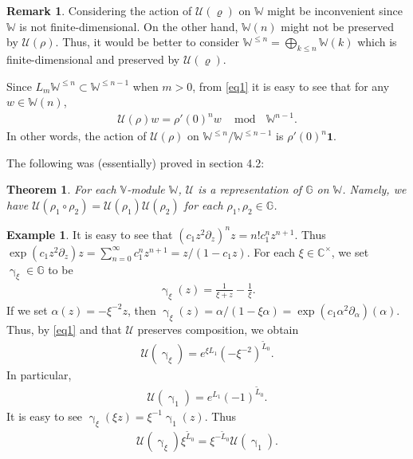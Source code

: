 \documentclass[11pt,b5paper,notitlepage]{article}
\theoremstyle{definition}
\newtheorem{eg}[df]{Example}
\newtheorem{rem}[df]{Remark}
\theoremstyle{plain}
\newtheorem{thm}[df]{Theorem}
\newcommand{\mc}{\mathcal}
\newcommand{\wtd}{\widetilde}
\newcommand{\id}{\mathbf{1}}
\newcommand{\Vbb}{\mathbb V}
\newcommand{\Wbb}{\mathbb W}
\newcommand{\Gbb}{\mathbb G}
\newcommand{\Cbb}{\mathbb C}
\numberwithin{equation}{section}
\begin{document}
\begin{rem}
Considering the action of $\mc U(\varrho)$ on $\Wbb$ might be inconvenient since $\Wbb$ is not finite-dimensional. On the other hand, $\Wbb(n)$ might not be preserved by $\mc U(\rho)$. Thus, it would be better to consider $\Wbb^{\leq n}=\bigoplus_{k\leq n}\Wbb(k)$\index{VW@$\Vbb^{\leq n},\Wbb^{\leq n}$} which is finite-dimensional and preserved by $\mc U(\varrho)$.

Since $L_m\Wbb^{\leq n}\subset\Wbb^{\leq n-1}$ when $m>0$, from \eqref{eq1} it is easy to see that for any $w\in\Wbb(n)$,
\begin{align}
\mc U(\rho)w=\rho'(0)^nw~~\mod~~ \Wbb^{n-1}.\label{eq5}
\end{align}
In other words, the action of $\mc U(\rho)$ on $\Wbb^{\leq n}/\Wbb^{\leq n-1}$ is $\rho'(0)^n\id$.
\end{rem}


The following was (essentially) proved in \cite{Hua97a} section 4.2:
\begin{thm}
	For each $\Vbb$-module $\Wbb$, $\mc U$ is a representation of $\Gbb$ on $\Wbb$. Namely, we have $\mc U(\rho_1\circ\rho_2)=\mc U(\rho_1)\mc U(\rho_2)$ for each $\rho_1,\rho_2\in\Gbb$.
\end{thm}


\begin{eg}
It is easy to see that $(c_1z^2\partial_z)^nz=n!c_1^nz^{n+1}$. Thus $\exp(c_1z^2\partial_z)z=\sum_{n=0}^{\infty}c_1^nz^{n+1}=z/(1-c_1z)$. For each $\xi\in\Cbb^\times$, we set $\upgamma_\xi\in\Gbb$  to be
\begin{align}
\upgamma_\xi(z)=\frac 1{\xi+z}-\frac 1\xi.
\end{align}
If we set $\alpha(z)=-\xi^{-2}z$, then $\upgamma_\xi(z)=\alpha/(1-\xi \alpha)=\exp(c_1\alpha^2\partial_\alpha)(\alpha)$. Thus, by \eqref{eq1} and that $\mc U$ preserves composition, we obtain
\begin{align}
\mc U(\upgamma_\xi)=e^{\xi L_1}(-\xi^{-2})^{\wtd L_0}.
\end{align}
In particular,
\begin{align}
\mc U(\upgamma_1)=e^{L_1}(-1)^{\wtd L_0}.
\end{align}
It is easy to see $\upgamma_\xi(\xi z)=\xi^{-1}\upgamma_1(z)$. Thus
\begin{align}
\mc U(\upgamma_\xi)\xi^{\wtd L_0}=\xi^{-\wtd L_0}\mc U(\upgamma_1).\label{eq22}
\end{align}
\end{eg}
\end{document}
